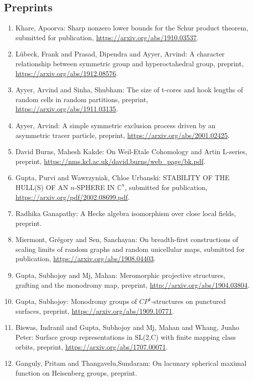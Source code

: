 \subsection{Preprints}

\begin{enumerate}
\item Khare, Apoorva: Sharp nonzero lower bounds for the Schur product theorem, submitted for publication, \url{https://arxiv.org/abs/1910.03537}.
\item Lübeck, Frank and Prasad, Dipendra and Ayyer, Arvind: A character relationship between symmetric group and hyperoctahedral group, preprint, \url{https://arxiv.org/abs/1912.08576}.
\item Ayyer, Arvind and Sinha, Shubham: The size of t-cores and hook lengths of random cells in random partitions, preprint, \url{https://arxiv.org/abs/1911.03135}.
\item Ayyer, Arvind: A simple symmetric exclusion process driven by an asymmetric tracer particle, preprint, \url{https://arxiv.org/abs/2001.02425}.
\item David Burns, Mahesh Kakde: On Weil-Etale Cohomology and Artin L-series, preprint, \url{https://nms.kcl.ac.uk/david.burns/web_page/bk.pdf}.
\item Gupta, Purvi and Wawrzyniak, Chloe Urbanski: STABILITY OF THE HULL(S) OF AN $n$-SPHERE IN $\mathbb{C}^n$, submitted for publication, \url{https://arxiv.org/pdf/2002.08699.pdf}.
\item Radhika Ganapathy: A Hecke algebra isomorphism over close local fields, preprint.
\item Miermont, Grégory and Sen, Sanchayan: On breadth-first constructions of scaling limits of random graphs and random unicellular maps, submitted for publication, \url{https://arxiv.org/abs/1908.04403}.
\item Gupta, Subhojoy and Mj, Mahan: Meromorphic projective structures, grafting and the monodromy map, preprint, \url{http://arxiv.org/abs/1904.03804}.
\item Gupta, Subhojoy: Monodromy groups of $CP^1$-structures on punctured surfaces, preprint, \url{https://arxiv.org/abs/1909.10771}.
\item Biswas, Indranil and Gupta, Subhojoy and Mj, Mahan and Whang, Junho Peter: Surface group representations in SL(2,C) with finite mapping class orbits, preprint, \url{https://arxiv.org/abs/1707.00071}.
\item Ganguly, Pritam and Thangavelu,Sundaram: On lacunary spherical maximal function on Heisenberg groups, preprint.

\end{enumerate}
